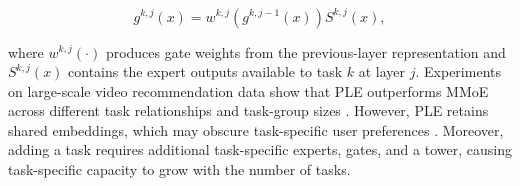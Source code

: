 \begin{equation}
g^{k,j}(x)
=
w^{k,j}\left(g^{k,j-1}(x)\right)S^{k,j}(x),
\label{eq}
\end{equation}

where $w^{k,j}(\cdot)$ produces gate weights from the previous-layer representation and $S^{k,j}(x)$ contains the expert outputs available to task $k$ at layer $j$. Experiments on large-scale video recommendation data show that PLE outperforms MMoE across different task relationships and task-group sizes \citep{Tang2020PLE}. However, PLE retains shared embeddings, which may obscure task-specific user preferences \citep{Su2024STEM}. Moreover, adding a task requires additional task-specific experts, gates, and a tower, causing task-specific capacity to grow with the number of tasks. 





